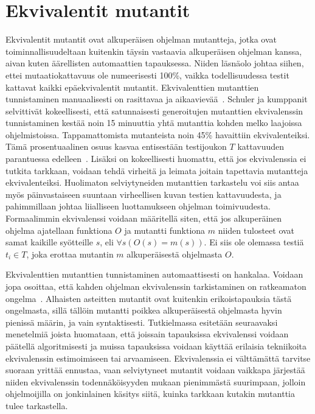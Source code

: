 \documentclass[finnish]{tktltiki2}
\begin{document}
\section{Ekvivalentit mutantit}
Ekvivalentit mutantit ovat alkuperäisen ohjelman mutantteja, jotka ovat toiminnallisuudeltaan kuitenkin täysin vastaavia alkuperäisen ohjelman kanssa, aivan kuten äärellisten automaattien tapauksessa. Niiden läsnäolo johtaa siihen, ettei mutaatiokattavuus ole numeerisesti 100\%, vaikka todellisuudessa testit kattavat kaikki epäekvivalentit mutantit. Ekvivalenttien mutanttien tunnistaminen manuaalisesti on rasittavaa ja aikaavievää~\cite{GrunSZ09}. Schuler ja kumppanit selvittivät kokeellisesti, että satunnaisesti generoitujen mutanttien ekvivalenssin tunnistaminen kestää noin 15 minuuttia yhtä mutanttia kohden melko laajoissa ohjelmistoissa. Tappamattomista mutanteista noin 45\% havaittiin ekvivalenteiksi. Tämä prosentuaalinen osuus kasvaa entisestään testijoukon $T$ kattavuuden parantuessa edelleen~\cite{SchulerZ10}. Lisäksi on kokeellisesti huomattu, että jos ekvivalenssia ei tutkita tarkkaan, voidaan tehdä virheitä ja leimata joitain tapettavia mutantteja ekvivalenteiksi. Huolimaton selviytyneiden mutanttien tarkastelu voi siis antaa myös päinvastaiseen suuntaan virheellisen kuvan testien kattavuudesta, ja pahimmillaan johtaa liialliseen luottamukseen ohjelman toimivuudesta. Formaalimmin ekvivalenssi voidaan määritellä siten, että jos alkuperäinen ohjelma ajatellaan funktiona $O$ ja mutantti funktiona $m$ niiden tulosteet ovat samat kaikille syötteille $s$, eli $\forall s(O(s) = m(s))$. Ei siis ole olemassa testiä $t_i \in T$, joka erottaa mutantin $m$ alkuperäisestä ohjelmasta $O$.

Ekvivalenttien mutanttien tunnistaminen automaattisesti on hankalaa. Voidaan jopa osoittaa, että kahden ohjelman ekvivalenssin tarkistaminen on ratkeamaton ongelma~\cite{}. Alhaisten asteitten mutantit ovat kuitenkin erikoistapauksia tästä ongelmasta, sillä tällöin mutantti poikkea alkuperäisestä ohjelmasta hyvin pienissä määrin, ja vain syntaktisesti. Tutkielmassa esitetään seuraavaksi menetelmiä joista huomataan, että joissain tapauksissa ekvivalenssi voidaan päätellä algoritmisesti ja muissa tapauksissa voidaan käyttää erilaisia tekniikoita ekvivalenssin estimoimiseen tai arvaamiseen. Ekvivalenssia ei välttämättä tarvitse suoraan yrittää ennustaa, vaan selviytyneet mutantit voidaan vaikkapa järjestää niiden ekvivalenssin todennäköisyyden mukaan pienimmästä suurimpaan, jolloin ohjelmoijilla on jonkinlainen käsitys siitä, kuinka tarkkaan kutakin mutanttia tulee tarkastella.
\end{document}
